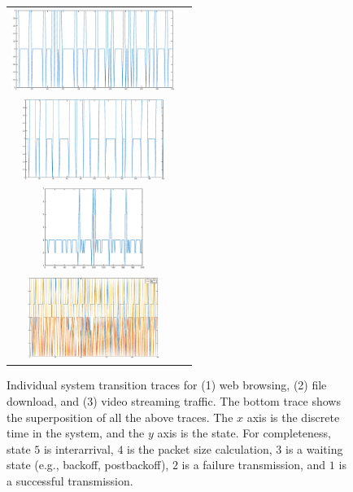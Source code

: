 \documentclass[conference]{IEEEtran}
\begin{document}
\begin{figure}
\begin{tabular}{cc}
\includegraphics[width=\textwidth,height=100px]{../../src/results/browse_time.eps} \\
\includegraphics[width=\textwidth,height=100px]{../../src/results/file_time.eps} \\
\includegraphics[width=\textwidth,height=100px]{../../src/results/video_time.eps} \\
\includegraphics[width=\textwidth,height=100px]{../../src/results/all.eps} \\
\end{tabular}
\caption{Individual system transition traces for (1) web browsing, (2) file download, and (3) video streaming traffic. The bottom trace shows the superposition of all the above traces. The $x$ axis is the discrete time in the system, and the $y$ axis is the state. For completeness, state $5$ is interarrival, $4$ is the packet size calculation, $3$ is a waiting state (e.g., backoff, postbackoff), $2$ is a failure transmission, and $1$ is a successful transmission.}
\label{fig:traces}
\end{figure}

\end{document}
